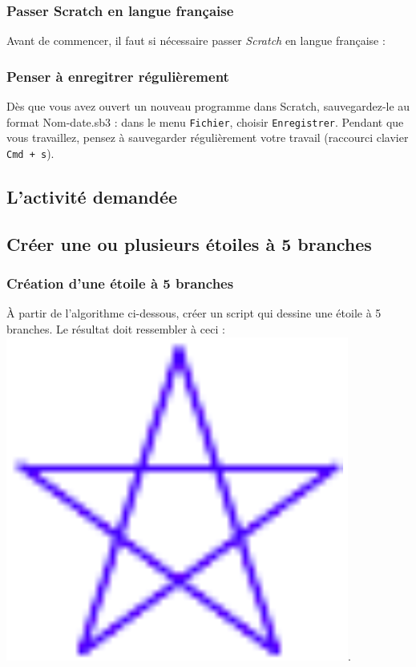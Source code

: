 \subsubsection{Passer Scratch en langue française} 

Avant de commencer, il faut si nécessaire passer \emph{Scratch} en langue française :


\subsubsection{Penser à enregitrer régulièrement}

Dès que vous avez ouvert un nouveau programme dans Scratch, sauvegardez-le au format Nom-date.sb3 : dans le menu \texttt{Fichier}, choisir \texttt{Enregistrer}. Pendant que vous travaillez, pensez à sauvegarder régulièrement votre travail (raccourci clavier \texttt{Cmd + s}).   

\vfill

\subsection{L'activité demandée}

\vspace{10pt}



\subsection{Créer une ou plusieurs étoiles à 5 branches}

\subsubsection{Création d’une étoile à 5 branches}


À partir de l’algorithme ci-dessous, créer un script qui dessine une étoile à 5 branches.
Le résultat doit ressembler à ceci : \includegraphics[width=.9cm]{./images/scratch03/fonction/Scratch_Fonctions_02}.

